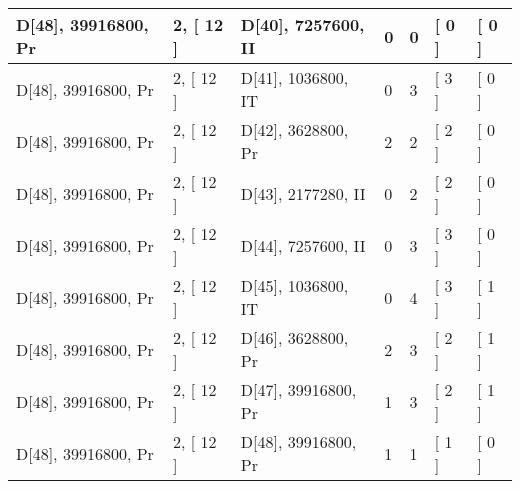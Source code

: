 \documentclass[9 pt]{scrartcl}
\begin{document}
\begin{longtable}{ |p{3em}|p{6em}|p{3em}|p{2em}|p{2em}|p{6em}|p{6em}| }
D[48], 39916800, Pr &2, [ 12 ] & D[40], 7257600, II  & 0 & 0 & [ 0 ] & [ 0 ]\\ \hline
D[48], 39916800, Pr &2, [ 12 ] & D[41], 1036800, IT  & 0 & 3 & [ 3 ] & [ 0 ]\\ \hline
D[48], 39916800, Pr &2, [ 12 ] & D[42], 3628800, Pr  & 2 & 2 & [ 2 ] & [ 0 ]\\ \hline
D[48], 39916800, Pr &2, [ 12 ] & D[43], 2177280, II  & 0 & 2 & [ 2 ] & [ 0 ]\\ \hline
D[48], 39916800, Pr &2, [ 12 ] & D[44], 7257600, II  & 0 & 3 & [ 3 ] & [ 0 ]\\ \hline
D[48], 39916800, Pr &2, [ 12 ] & D[45], 1036800, IT  & 0 & 4 & [ 3 ] & [ 1 ]\\ \hline
D[48], 39916800, Pr &2, [ 12 ] & D[46], 3628800, Pr  & 2 & 3 & [ 2 ] & [ 1 ]\\ \hline
D[48], 39916800, Pr &2, [ 12 ] & D[47], 39916800, Pr  & 1 & 3 & [ 2 ] & [ 1 ]\\ \hline
D[48], 39916800, Pr &2, [ 12 ] & D[48], 39916800, Pr  & 1 & 1 & [ 1 ] & [ 0 ]\\ \hline
\end{longtable}
\end{document}
